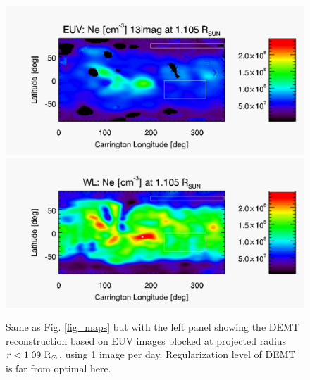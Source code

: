 \documentclass[baaa]{baaa}
\begin{document}
\clearpage


\begin{figure}[]
  \centering
  \includegraphics[width=\columnwidth]{map_Ne_CR2198_DEMT-AIA_H1-L07-09-09_r3D_reduced_1105_Rsun.pdf}
  \includegraphics[width=\columnwidth]{map_ne_kcor.pdf}
  \caption{Same as Fig. \ref{fig_maps} but with the left panel showing the DEMT reconstruction based on EUV images blocked at projected radius $r<1.09~\rm{R}_\odot$, using 1 image per day. Regularization level of DEMT is far from optimal here.}
  \label{fig_maps4}
\end{figure}
\end{document}
